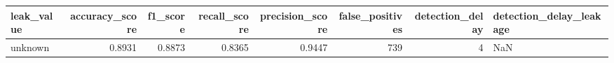 \begin{tabular}{lrrrrrrl}
\toprule
leak\_value & accuracy\_score & f1\_score & recall\_score & precision\_score & false\_positives & detection\_delay & detection\_delay\_leakage \\
\midrule
unknown & 0.8931 & 0.8873 & 0.8365 & 0.9447 & 739 & 4 & NaN \\
\bottomrule
\end{tabular}
